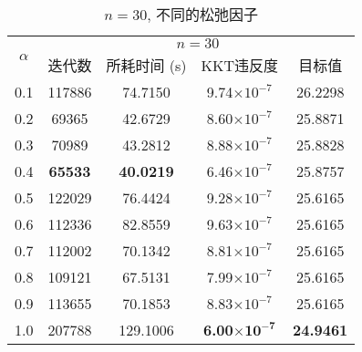 \begin{table}[htbp]
	\renewcommand{\captionfont}{\small}
    \centering
    \caption{$n=30$, 不同的松弛因子}
    \label{n30alpha}
    \vskip 4mm
    \begin{tabular}{c|c|c|c|c}
        \hline
        \multirow{2}{*}{$\alpha$} & \multicolumn{4}{c}{$n=30$}\\\cline{2-5}
          & 迭代数 & 所耗时间 (s) & KKT违反度 & 目标值\\\hline
        0.1 & 117886 & 74.7150 & 9.74$\times10^{-7}$ & 26.2298 \\\hline
        0.2 & 69365 & 42.6729 & 8.60$\times10^{-7}$ & 25.8871 \\\hline
        0.3 & 70989 & 43.2812 & 8.88$\times10^{-7}$ & 25.8828 \\\hline
        0.4 & \textbf{65533} & \textbf{40.0219} & 6.46$\times10^{-7}$ & 25.8757 \\\hline
        0.5 & 122029 & 76.4424 & 9.28$\times10^{-7}$ & 25.6165 \\\hline
        0.6 & 112336 & 82.8559 & 9.63$\times10^{-7}$ & 25.6165 \\\hline
        0.7 & 112002 & 70.1342 & 8.81$\times10^{-7}$ & 25.6165 \\\hline
        0.8 & 109121 & 67.5131 & 7.99$\times10^{-7}$ & 25.6165 \\\hline
        0.9 & 113655 & 70.1853 & 8.83$\times10^{-7}$ & 25.6165 \\\hline
        1.0 & 207788 & 129.1006 & \textbf{6.00$\mathbf{\times10^{-7}}$} & \textbf{24.9461} \\\hline
    \end{tabular}
\end{table}

